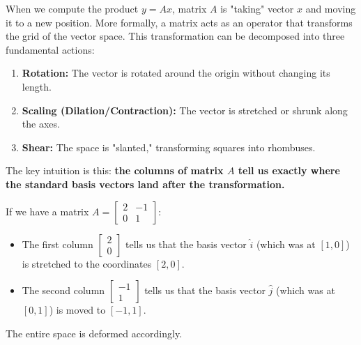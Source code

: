 When we compute the product $y = Ax$, matrix $A$ is "taking" vector $x$ and moving it to a new position. More formally, a matrix acts as an operator that transforms the grid of the vector space. This transformation can be decomposed into three fundamental actions:

\begin{enumerate}
    \item \textbf{Rotation:} The vector is rotated around the origin without changing its length.
    \item \textbf{Scaling (Dilation/Contraction):} The vector is stretched or shrunk along the axes.
    \item \textbf{Shear:} The space is "slanted," transforming squares into rhombuses.
\end{enumerate}

The key intuition is this: \textbf{the columns of matrix $A$ tell us exactly where the standard basis vectors land after the transformation.}

If we have a matrix $A = \begin{bmatrix} 2 & -1 \\ 0 & 1 \end{bmatrix}$:
\begin{itemize}
    \item The first column $\begin{bmatrix} 2 \\ 0 \end{bmatrix}$ tells us that the basis vector $\hat{i}$ (which was at $[1, 0]$) is stretched to the coordinates $[2, 0]$.
    \item The second column $\begin{bmatrix} -1 \\ 1 \end{bmatrix}$ tells us that the basis vector $\hat{j}$ (which was at $[0, 1]$) is moved to $[-1, 1]$.
\end{itemize}

The entire space is deformed accordingly.

